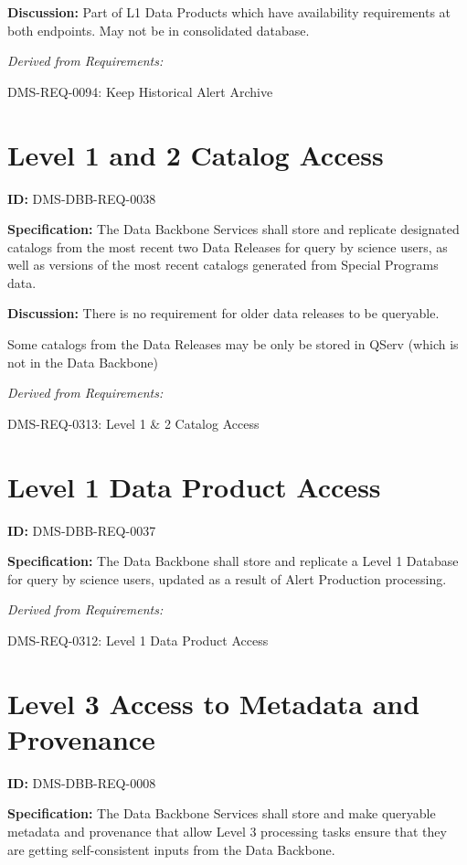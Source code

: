 \documentclass[SE,toc,lsstdraft]{lsstdoc}
\begin{document}
\textbf{Discussion:}
Part of L1 Data Products which have availability requirements at both endpoints.  May not be in consolidated database.

\emph{Derived from Requirements:}

DMS-REQ-0094:
Keep Historical Alert Archive \newline

\section{Level 1 and 2 Catalog Access}

\label{DMS-DBB-REQ-0038}
\textbf{ID:} DMS-DBB-REQ-0038

\textbf{Specification:}
The Data Backbone Services shall store and replicate designated catalogs from the most recent two Data Releases for query by science users, as well as versions of the most recent catalogs generated from Special Programs data.

\textbf{Discussion:}
There is no requirement for older data releases to be queryable.

Some catalogs from the Data Releases may be only be stored in QServ (which is not in the Data Backbone)

\emph{Derived from Requirements:}

DMS-REQ-0313:
Level 1 \& 2 Catalog Access \newline

\section{Level 1 Data Product Access}

\label{DMS-DBB-REQ-0037}
\textbf{ID:} DMS-DBB-REQ-0037

\textbf{Specification:}
The Data Backbone shall store and replicate a Level 1 Database for query by science users, updated as a result of Alert Production processing.

\emph{Derived from Requirements:}

DMS-REQ-0312:
Level 1 Data Product Access \newline

\section{Level 3 Access to Metadata and Provenance}

\label{DMS-DBB-REQ-0008}
\textbf{ID:} DMS-DBB-REQ-0008

\textbf{Specification:}
The Data Backbone Services shall store and make queryable metadata and provenance that allow Level 3 processing tasks ensure that they are getting self-consistent inputs from the Data Backbone.
\end{document}
